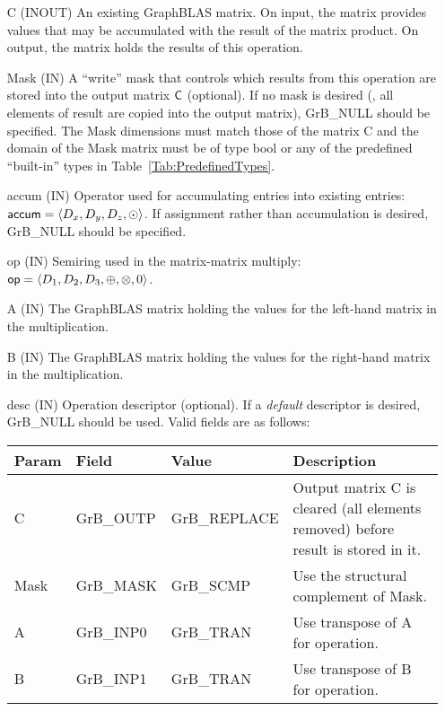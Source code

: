 \begin{itemize}[leftmargin=1.1in]
    \item[{\sf C}]    ({\sf INOUT}) An existing GraphBLAS matrix. On
    input, the matrix provides values that may be accumulated with the
    result of the matrix product.   On output, the matrix holds the
    results of this operation.

    \item[{\sf Mask}] ({\sf IN}) A ``write'' mask that controls which
    results from this operation are stored into the output matrix
    ${\sf C}$ (optional).  If no mask is desired (\ie, all elements
    of result are copied into the output matrix), {\sf GrB\_NULL}
    should be specified. The Mask dimensions must match those of the
    matrix {\sf C} and the domain of the {\sf Mask} matrix must be
    of type {\sf bool} or any of the predefined ``built-in'' types in
    Table~\ref{Tab:PredefinedTypes}.

    \item[{\sf accum}] ({\sf IN}) Operator used for accumulating entries
    into existing  entries: ${\sf accum} = \langle D_x,
    D_y, D_z,\odot \rangle$. If assignment rather than accumulation is
    desired, {\sf GrB\_NULL} should be specified.

    \item[{\sf op}] ({\sf IN}) Semiring used in the matrix-matrix
    multiply: ${\sf op}=\langle D_1,D_2,D_3,\oplus,\otimes,0 \rangle$.

    \item[{\sf A}] ({\sf IN}) The GraphBLAS matrix holding the values
    for the left-hand matrix in the multiplication.

    \item[{\sf B}] ({\sf IN}) The GraphBLAS matrix holding the values
    for the right-hand matrix in the multiplication.

    \item[{\sf desc}] ({\sf IN}) Operation descriptor (optional). If
    a \emph{default} descriptor is desired, {\sf GrB\_NULL} should be
    used. Valid fields are as follows: 

    \begin{tabular}{lllp{2.5in}}
    Param   & Field           & Value               & Description \\ \hline
    {\sf C}    & {\sf GrB\_OUTP} & {\sf GrB\_REPLACE}  & Output matrix {\sf C} is cleared (all elements removed) before result is stored in it. \\
    {\sf Mask} & {\sf GrB\_MASK} & {\sf GrB\_SCMP}     & Use the structural complement of {\sf Mask}. \\
    {\sf A}    & {\sf GrB\_INP0} & {\sf GrB\_TRAN}     & Use transpose of {\sf A} for operation. \\
    {\sf B}    & {\sf GrB\_INP1} & {\sf GrB\_TRAN}     & Use transpose of {\sf B} for operation. \\
    \end{tabular}
\end{itemize}

